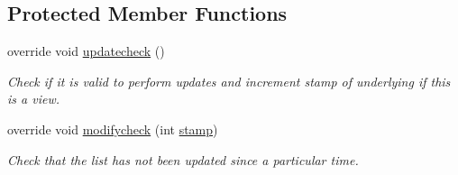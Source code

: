 \subsection*{Protected Member Functions}
\begin{DoxyCompactItemize}
\item 
override void \hyperlink{class_c5_1_1_hashed_linked_list_af71c07992c8c580b5624734cbdd1bd4e}{updatecheck} ()
\begin{DoxyCompactList}\small\item\em Check if it is valid to perform updates and increment stamp of underlying if this is a view. \end{DoxyCompactList}\item 
override void \hyperlink{class_c5_1_1_hashed_linked_list_a1e067df13f4f6b5f90753abf3db99ed7}{modifycheck} (int \hyperlink{class_c5_1_1_collection_base_ae13bd5b482306a49a4d10654a9b8b064}{stamp})
\begin{DoxyCompactList}\small\item\em Check that the list has not been updated since a particular time. \end{DoxyCompactList}\end{DoxyCompactItemize}
